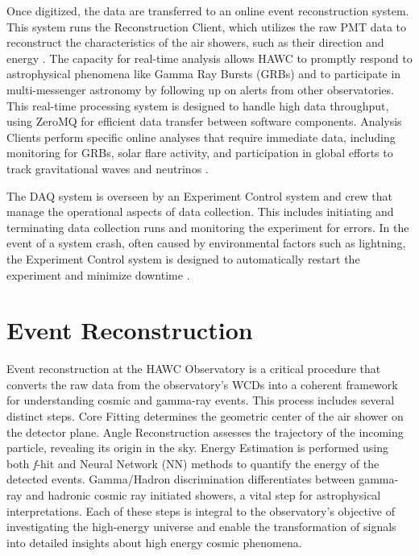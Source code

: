 Once digitized, the data are transferred to an online event reconstruction system.
This system runs the Reconstruction Client, which utilizes the raw PMT data to reconstruct the characteristics of the air showers, such as their direction and energy \cite{HAWC_DAQ_NIM}.
The capacity for real-time analysis allows HAWC to promptly respond to astrophysical phenomena like Gamma Ray Bursts (GRBs) and to participate in multi-messenger astronomy by following up on alerts from other observatories.
This real-time processing system is designed to handle high data throughput, using ZeroMQ \cite{zeromq} for efficient data transfer between software components.
Analysis Clients perform specific online analyses that require immediate data, including monitoring for GRBs, solar flare activity, and participation in global efforts to track gravitational waves and neutrinos \cite{HAWC_NIM}.

The DAQ system is overseen by an Experiment Control system and crew that manage the operational aspects of data collection.
This includes initiating and terminating data collection runs and monitoring the experiment for errors.
In the event of a system crash, often caused by environmental factors such as lightning, the Experiment Control system is designed to automatically restart the experiment and minimize downtime \cite{HAWC_NHAWC_NIM,HAWC_DAQ_NIM}.

\section{Event Reconstruction} \label{sec:hawc_reconstruction}

Event reconstruction at the HAWC Observatory is a critical procedure that converts the raw data from the observatory's WCDs into a coherent framework for understanding cosmic and gamma-ray events.
This process includes several distinct steps.
Core Fitting determines the geometric center of the air shower on the detector plane.
Angle Reconstruction assesses the trajectory of the incoming particle, revealing its origin in the sky.
Energy Estimation is performed using both \textit{f}-hit and Neural Network (NN) methods to quantify the energy of the detected events.
Gamma/Hadron discrimination differentiates between gamma-ray and hadronic cosmic ray initiated showers, a vital step for astrophysical interpretations.
Each of these steps is integral to the observatory's objective of investigating the high-energy universe and enable the transformation of signals into detailed insights about high energy cosmic phenomena.

